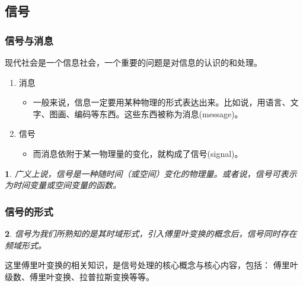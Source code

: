 \documentclass[notheorems,compress,mathserif,table]{beamer}
\newtheorem{dablock}{}
\begin{document}
\subsection{信号}
\begin{frame}\frametitle{信号与消息}%

    现代社会是一个信息社会，一个重要的问题是对信息的认识的和处理。
\begin{enumerate}
  \item 消息
      \begin{itemize}
          \item 一般来说，信息一定要用某种物理的形式表达出来。比如说，用语言、文字、图画、编码等东西。这些东西被称为消息(message)。
      \end{itemize}
  \item 信号
      \begin{itemize}
         \item 而消息依附于某一物理量的变化，就构成了信号(signal)。
      \end{itemize}
\end{enumerate}
%
%
%
%
%
%
\begin{dablock}
   广义上说，信号是一种随时间（或空间）变化的物理量。或者说，信号可表示为时间变量或空间变量的函数。
\end{dablock}
\end{frame}
%
%
%
%
%
%
\begin{frame}[shrink]\frametitle{信号的形式}%
\begin{dablock}
信号为我们所熟知的是其时域形式，引入傅里叶变换的概念后，信号同时存在频域形式。
\end{dablock}
这里傅里叶变换的相关知识，是信号处理的核心概念与核心内容，包括： 傅里叶级数、傅里叶变换、拉普拉斯变换等等。


\end{frame}
%
%
%
%
%
%
\end{document}
